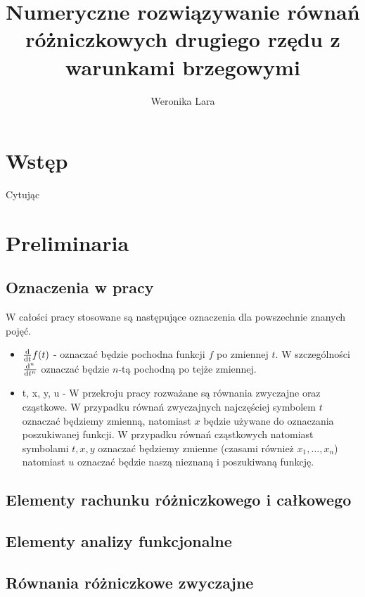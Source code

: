 \documentclass[12pt,a4paper]{report}
\author{Weronika Lara}
\title{Numeryczne rozwiązywanie równań różniczkowych drugiego rzędu z warunkami brzegowymi}
\begin{document}
\maketitle

\chapter{Wstęp}

Cytując \citep[Rozdział 3, sekcja 2]{palczewski2004rownania}

\chapter{Preliminaria}

\section{Oznaczenia w pracy}

W całości pracy stosowane są następujące oznaczenia dla powszechnie znanych pojęć.
\begin{itemize}
\item $\ddx{t} f(t)$ - oznaczać będzie pochodna funkcji $f$ po zmiennej $t$. W szczególności $\ddx[^n]{t^n}$ oznaczać będzie $n$-tą pochodną po tejże zmiennej.
\item t, x, y, u - W przekroju pracy rozważane są równania zwyczajne oraz cząstkowe. W przypadku równań zwyczajnych najczęściej symbolem $t$ oznaczać będziemy zmienną, natomiast $x$ będzie używane do oznaczania poszukiwanej funkcji. W przypadku równań cząstkowych natomiast symbolami $t,x,y$ oznaczać będziemy zmienne (czasami również $x_1,\ldots,x_n$) natomiast $u$ oznaczać będzie naszą nieznaną i poszukiwaną funkcję.
\end{itemize}

\section{Elementy rachunku różniczkowego i całkowego}


\section{Elementy analizy funkcjonalne}



\section{Równania różniczkowe zwyczajne}
\end{document}
